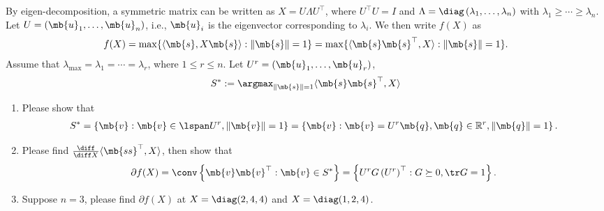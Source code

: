 \begin{exercise}
\begin{enumerate}
      By eigen-decomposition, a symmetric matrix can be written as $X=U \Lambda U^{\top}$, where $U^{\top} U=I$ and $ \Lambda=\diag\left(\lambda_{1}, \ldots, \lambda_{n}\right)$ with $\lambda_{1} \geq \cdots \geq \lambda_{n}$. Let $U=\left(\mb{u}_{1}, \ldots, \mb{u}_{n}\right)$, i.e., $\mb{u}_{i}$ is the eigenvector corresponding to $\lambda_{i}$. We then write $f(X)$ as
      \begin{align*}
        f(X) =\max \{\langle\mb{s}, X\mb{s}\rangle :\|\mb{s}\|=1\} =\max \{\langle\mb{s}\mb{s}^\top, X\rangle :\|\mb{s}\|=1\} .
      \end{align*}
      Assume that $\lambda_{\max }=\lambda_{1}=\cdots=\lambda_{r}$, where $1 \leq r \leq n$. Let $U^{r}=\left(\mb{u}_{1}, \ldots, \mb{u}_{r}\right)$,
      \begin{align*}
        S^{*}:=\argmax_{\|\mb{s}\|=1}\langle \mb{s}\mb{s}^{\top},X\rangle
      \end{align*}
      
      \begin{enumerate}
        \item Please show that
          \begin{align*}
            S^*=\left\{\mb{v}: \mb{v} \in \lspan U^{r},\|\mb{v}\|=1\right\} =\left\{\mb{v}: \mb{v}=U^{r} \mb{q}, \mb{q} \in \mathbb{R}^{r}, \|\mb{q}\|=1\right\}.
          \end{align*}
        \item Please find $\frac{\diff}{\diff X}\langle \mb{ss}^\top, X\rangle$, then show that
          \begin{align*}
            \partial f(X)=\conv\left\{\mb{v} \mb{v}^{\top}: \mb{v} \in S^{*}\right\}=\left\{U^{r} G\left(U^{r}\right)^{\top}: G \succeq 0, \tr G=1\right\}.
          \end{align*}
          
        \item Suppose $n=3$, please find $\partial f(X)$ at $X=\diag(2,4,4)$ and $X=\diag(1,2,4)$.
      \end{enumerate}
      

\end{enumerate}
\end{exercise}
